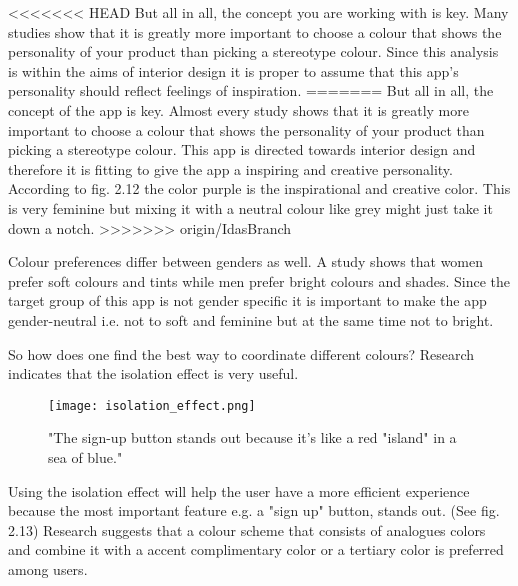 <<<<<<< HEAD
But all in all, the concept you are working with is key. Many studies show that it is greatly more important to choose a colour that shows the personality of your product than picking a stereotype colour. \cite{ColorMeaning} %
Since this analysis is within the aims of interior design it is proper to assume that this app's personality should reflect feelings of inspiration. 
=======
But all in all, the concept of the app is key. Almost every study shows that it is greatly more important to choose a colour that shows the personality of your product than picking a stereotype colour. \cite{ColorMeaning} This app is directed towards interior design and therefore it is fitting to give the app a inspiring and creative personality. According to fig. 2.12 the color purple is the inspirational and creative color. This is very feminine but mixing it with a neutral colour like grey might just take it down a notch. %
>>>>>>> origin/IdasBranch

Colour preferences differ between genders as well. A study shows that women prefer soft colours and tints while men prefer bright colours and shades. \cite{ColorMeaning} Since the target group of this app is not gender specific it is important to make the app gender-neutral i.e. not to soft and feminine but at the same time not to bright. 

So how does one find the best way to coordinate different colours? Research indicates that the isolation effect is very useful.

\begin{figure}[H]
\centering
\texttt{[image: isolation\_effect.png]}
\caption{"The sign-up button stands out because it's like a red "island" in a sea of blue." \cite{ColorMeaning}}
\end{figure}

Using the isolation effect will help the user have a more efficient experience because the most important feature e.g. a "sign up" button, stands out. \cite{ColorMeaning} (See fig. 2.13)%
Research suggests that a colour scheme that consists of analogues colors and combine it with a accent complimentary color or a tertiary color is preferred among users. \cite{ColorMeaning} 

